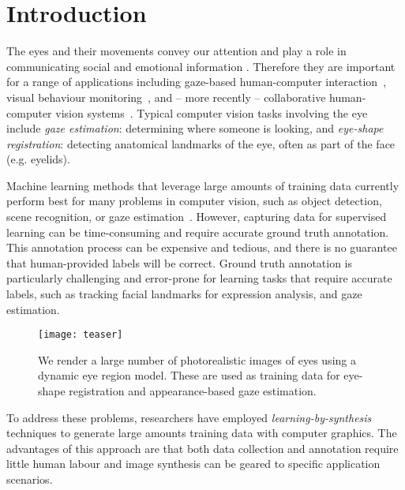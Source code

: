 
\section{Introduction}

The eyes and their movements convey our attention and play a role in communicating social and emotional information \cite{Argyle1965}.
Therefore they are important for a range of applications including gaze-based human-computer interaction~\cite{majaranta14_apc}, visual behaviour monitoring~\cite{bulling11_pami}, and -- more recently -- collaborative human-computer vision systems~\cite{yun2013studying,papadopoulos2014training,sattar15_cvpr}. 
Typical computer vision tasks involving the eye include \emph{gaze estimation}: determining where someone is looking, and \emph{eye-shape registration}: detecting anatomical landmarks of the eye, often as part of the face (e.g. eyelids).

Machine learning methods that leverage large amounts of training data currently perform best for many problems in computer vision, such as object detection, scene recognition, or gaze estimation~\cite{zhou2014learning,girshick2014rich,zhang15_cvpr}.
However, capturing data for supervised learning can be time-consuming and require accurate ground truth annotation.
This annotation process can be expensive and tedious, and there is no guarantee that human-provided labels will be correct.
Ground truth annotation is particularly challenging and error-prone for learning tasks that require accurate labels, such as tracking facial landmarks for expression analysis, and gaze estimation.

\begin{figure}
    \texttt{[image: teaser]}
    \caption{We render a large number of photorealistic images of eyes using a dynamic eye region model. These are used as training data for eye-shape registration and appearance-based gaze estimation.}
    \label{fig:teaser}
\end{figure}

To address these problems, researchers have employed \emph{learning-by-synthesis} techniques to generate large amounts training data with computer graphics.
The advantages of this approach are that both data collection and annotation require little human labour and image synthesis can be geared to specific application scenarios.

